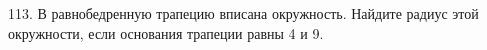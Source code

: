 113. В равнобедренную трапецию вписана окружность. Найдите радиус этой окружности, если основания трапеции равны 4 и 9.\\
